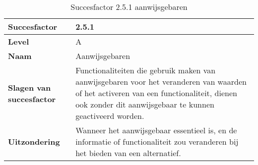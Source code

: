 \begin{table}[H]
    \centering
    \caption{Succesfactor 2.5.1 aanwijsgebaren}
    
    
    \hspace*{-1cm}\begin{tabular}{|l|p{12cm}|} 
        \hline
        \textbf{Succesfactor}                 & 2.5.1                                                                                                                                                                                                                                                                                                                                                                                                                                                                                                          \\ 
        \hline
        \textbf{Level}                        & A                                                                                                                                                                                                                                                                                                                                                                                                                                                                                                               \\ 
        \hline
        \textbf{Naam}                         & Aanwijsgebaren~                                                                                                                                                                                                                                                                                                                                                                                                                                                                                      \\ 
        \hline
        \textbf{Slagen van succesfactor}      & Functionaliteiten die gebruik maken van aanwijsgebaren voor het veranderen van waarden of het activeren van een functionaliteit, dienen ook zonder dit aanwijsgebaar te kunnen geactiveerd worden.                                                                                                            \\ 
                \hline
        \textbf{Uitzondering}     & 
        Wanneer het aanwijsgebaar essentieel is, en de informatie of functionaliteit zou veranderen bij het bieden van een alternatief.                                                                                                                                                                                                    \\ 

\end{tabular}
\end{table}
